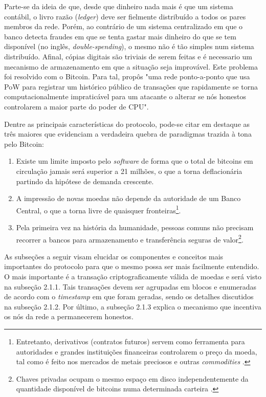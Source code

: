 \documentclass[a4paper,12pt]{monografia}
\theoremstyle{plain}
\theoremstyle{definition}
\theoremstyle{remark}
\begin{document}
Parte-se da ideia de que, desde que dinheiro nada mais \'e que um sistema cont\'abil, o livro raz\~ao (\textit{ledger}) deve ser fielmente distribu\'ido a todos os pares membros da rede.
Por\'em, ao contr\'ario de um sistema centralizado em que o banco detecta fraudes em que se tenta gastar mais dinheiro do que se tem dispon\'ivel (no ingl\^es, \textit{double-spending}), o mesmo n\~ao \'e t\~ao simples num sistema distribu\'ido.
Afinal, c\'opias digitais s\~ao triviais de serem feitas e \'e necessario um mecanismo de
armazenamento em que a situa\c{c}\~ao seja improv\'avel.
Este problema foi resolvido com o Bitcoin.
Para tal,  prop\^os "uma rede ponto-a-ponto que usa PoW para registrar um hist\'orico p\'ublico de transa\c{c}\~oes que rapidamente se torna computacionalmente impratic\'avel para um atacante o alterar se n\'os honestos controlarem a maior parte do poder de CPU".

Dentre as principais caracter\'isticas do protocolo, pode-se citar em destaque as tr\^es maiores que evidenciam a verdadeira quebra de paradigmas trazida \`a tona pelo Bitcoin:

\begin{enumerate}
\item Existe um limite imposto pelo \textit{software} de forma que o total de bitcoins em circula\c{c}\~ao jamais ser\'a superior a 21 milh\~oes, o que a torna deflacion\'aria partindo da hip\'otese de demanda crescente.
\item A impress\~ao de novas moedas n\~ao depende da autoridade de um Banco Central, o que a torna livre de quaisquer fronteiras\footnote{Entretanto, derivativos (contratos futuros) servem como ferramenta para autoridades e grandes institui\c{c}\~oes financeiras controlarem o pre\c{c}o da moeda, tal como \'e feito nos mercados de metais preciosos e outras \textit{commodities} \cite{nakedshort}.}.
\item Pela primeira vez na hist\'oria da humanidade, pessoas comuns n\~ao precisam recorrer a bancos para armazenamento e transfer\^{e}ncia seguras de valor\footnote{Chaves privadas ocupam o mesmo espa\c{c}o em disco independentemente da quantidade dispon\'{i}vel de bitcoins numa determinada carteira \cite{bitcoin}.}.
\end{enumerate}

As subse\c{c}\~{o}es a seguir visam elucidar os componentes e conceitos mais importantes do protocolo para que o mesmo possa ser mais facilmente entendido.
O mais importante \'{e} a transa\c{c}\~{a}o criptograficamente v\'{a}lida de moedas e ser\'{a} visto na subse\c{c}\~{a}o 2.1.1.
Tais transa\c{c}\~{o}es devem ser agrupadas em blocos e enumeradas de acordo com o \textit{timestamp} em que foram geradas, sendo os detalhes discutidos na subse\c{c}\~{a}o 2.1.2. Por \'{u}ltimo, a subse\c{c}\~{a}o 2.1.3 explica o mecanismo que incentiva os n\'{o}s da rede a permanecerem honestos.
\end{document}
